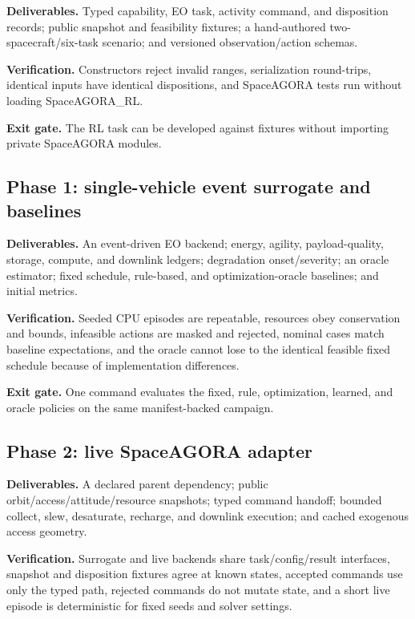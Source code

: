 \documentclass[11pt]{article}
\begin{document}
\textbf{Deliverables.}
Typed capability, EO task, activity command, and disposition records; public
snapshot and feasibility fixtures; a hand-authored two-spacecraft/six-task
scenario; and versioned observation/action schemas.

\textbf{Verification.}
Constructors reject invalid ranges, serialization round-trips, identical
inputs have identical dispositions, and SpaceAGORA tests run without loading
SpaceAGORA\_RL.

\textbf{Exit gate.}
The RL task can be developed against fixtures without importing private
SpaceAGORA modules.

\subsection{Phase 1: single-vehicle event surrogate and baselines}

\textbf{Deliverables.}
An event-driven EO backend; energy, agility, payload-quality, storage, compute,
and downlink ledgers; degradation onset/severity; an oracle estimator; fixed
schedule, rule-based, and optimization-oracle baselines; and initial metrics.

\textbf{Verification.}
Seeded CPU episodes are repeatable, resources obey conservation and bounds,
infeasible actions are masked and rejected, nominal cases match baseline
expectations, and the oracle cannot lose to the identical feasible fixed
schedule because of implementation differences.

\textbf{Exit gate.}
One command evaluates the fixed, rule, optimization, learned, and oracle
policies on the same manifest-backed campaign.

\subsection{Phase 2: live SpaceAGORA adapter}

\textbf{Deliverables.}
A declared parent dependency; public orbit/access/attitude/resource snapshots;
typed command handoff; bounded collect, slew, desaturate, recharge, and
downlink execution; and cached exogenous access geometry.

\textbf{Verification.}
Surrogate and live backends share task/config/result interfaces, snapshot and
disposition fixtures agree at known states, accepted commands use only the
typed path, rejected commands do not mutate state, and a short live episode is
deterministic for fixed seeds and solver settings.
\end{document}

